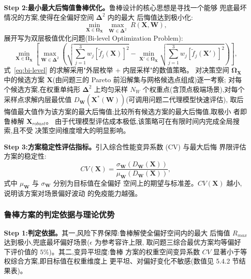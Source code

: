 \textbf{Step 2:最小最大后悔值鲁棒优化。}鲁棒设计的核心思想是寻找一个能够
兜底最坏情况的方案,使得在全偏好空间 $\boldsymbol{\Delta}^2$ 内的最大
后悔值达到极小化:
\begin{equation}
  \min_{\mathbf{X} \in \boldsymbol{\Omega}_{\mathbf{X}}} \;
  \max_{\mathbf{W} \in \boldsymbol{\Delta}^2} \;
  R(\mathbf{X}, \mathbf{W}),
  \label{eq:minimax}
\end{equation}
展开写为双层极值优化问题(Bi-level Optimization Problem):
\begin{equation}
  \min_{\mathbf{X} \in \boldsymbol{\Omega}_{\mathbf{X}}} \left[
    \max_{\mathbf{W} \in \boldsymbol{\Delta}^2} \left(
    \sqrt{\sum_{j=1}^3 w_j \left[\tilde{f}_j(\mathbf{X})\right]^2} -
    \min_{\mathbf{X}' \in \boldsymbol{\Omega}_{\mathbf{X}}}
    \sqrt{\sum_{j=1}^3 w_j \left[\tilde{f}_j(\mathbf{X}')\right]^2}
    \right) \right],
  \label{eq:bi-level}
\end{equation}
式~\eqref{eq:bi-level} 的求解采用"外层枚举 + 内层采样"的数值策略。
对决策空间 $\boldsymbol{\Omega}_{\mathbf{X}}$ 中的候选方案
$\mathbf{X}$(由问题三的 Pareto 前沿解集与网格候选点组成)逐一考察;
对每个候选方案,在权重单纯形 $\boldsymbol{\Delta}^2$ 上均匀采样 $N_W$
个权重点(含顶点极端场景),对每个采样点求解内层最优值
$D_{\mathbf{W}}(\mathbf{X}^*(\mathbf{W}))$(可调用问题二代理模型快速评估),
取后悔值最大值作为该方案的最大后悔值;比较所有候选方案的最大后悔值,取极小
者即鲁棒解 $\mathbf{X}_{robust}$。
由于代理模型评估成本极低,该策略可在有限时间内完成全局搜索,且不受
决策空间维度增大的明显影响。

\textbf{Step 3:方案稳定性评估指标。}引入综合性能变异系数 (CV) 与最大后悔
界限评估方案的稳定性:
\begin{equation}
  CV(\mathbf{X}) = \frac{\sigma_{\mathbf{W}}\left(
    D_{\mathbf{W}}(\mathbf{X}) \right)}
  {\mu_{\mathbf{W}}\left( D_{\mathbf{W}}(\mathbf{X}) \right)},
  \label{eq:cv}
\end{equation}
式中 $\mu_{\mathbf{W}}$ 与 $\sigma_{\mathbf{W}}$ 分别为目标值在全偏好
空间上的期望与标准差。$CV(\mathbf{X})$ 越小,说明该方案对场景偏好波动
的免疫能力越强。

\subsubsection{鲁棒方案的判定依据与理论优势}

\textbf{Step 1:判定依据。}其一,风险下界保障:鲁棒解使全偏好空间内的最大
后悔值 $R_{max}$ 达到极小,兜底最坏偏好场景($\epsilon$ 为参考容许上限,
取问题三综合最优方案均等偏好下评价值的 $5\%$)。其二,变异平坦度:鲁棒
方案的权重空间变异系数 $CV$ 显著小于等权综合方案,即目标值在权重维度上
更平坦、对偏好变化不敏感(数值见 5.4.2 节结果表)。

